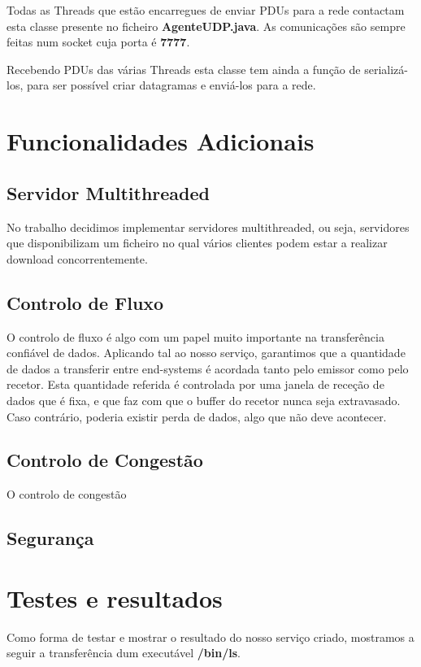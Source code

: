 \documentclass{llncs}
\begin{document}
Todas as Threads que estão encarregues de enviar PDUs para a rede contactam esta classe presente no ficheiro \textbf{AgenteUDP.java}. As comunicações são sempre feitas num socket cuja porta é \textbf{7777}.

Recebendo PDUs das várias Threads esta classe tem ainda a função de serializá-los, para ser possível criar datagramas e enviá-los para a rede.


\section{Funcionalidades Adicionais}

\subsection{Servidor Multithreaded}
No trabalho decidimos implementar servidores multithreaded, ou seja, servidores que disponibilizam um ficheiro no qual vários clientes podem estar a realizar download concorrentemente.

\subsection{Controlo de Fluxo}
O controlo de fluxo é algo com um papel muito importante na transferência confiável de dados. Aplicando tal ao nosso serviço, garantimos que a quantidade de dados a transferir entre end-systems é acordada tanto pelo emissor como pelo recetor. Esta quantidade referida é controlada por uma janela de receção de dados que é fixa, e que faz com que o buffer do recetor nunca seja extravasado. Caso contrário, poderia existir perda de dados, algo que não deve acontecer.

\subsection{Controlo de Congestão}
O controlo de congestão

\subsection{Segurança}



\section{Testes e resultados}

Como forma de testar e mostrar o resultado do nosso serviço criado, mostramos a seguir a transferência dum executável \textbf{/bin/ls}.
\end{document}
